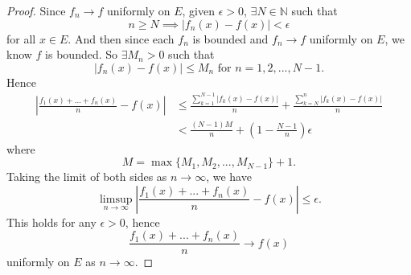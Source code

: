\begin{Exercise}
\begin{proof}
Since $f_n\to f$ uniformly on $E$, given $\epsilon > 0$, $\exists N\in\mathbb{N}$ such that $$n\geq N \implies \left| f_n(x)-f(x) \right| < \epsilon$$ for all $x\in E$. And then since each $f_n$ is bounded and $f_n\to f$ uniformly on $E$, we know $f$ is bounded. So $\exists M_n > 0$ such that $$\left| f_n(x)-f(x) \right| \leq M_n\mbox{ for } n=1,2,...,N-1.$$
Hence 
\begin{align*}
\left| \frac{f_1(x)+...+f_n(x)}{n}-f(x) \right| 
&\leq \frac{\sum_{k=1}^{N-1}\left| f_k(x)-f(x) \right|}{n} + \frac{\sum_{k=N}^{n}\left| f_k(x)-f(x) \right|}{n} \\
&< \frac{(N-1)M}{n} + \left( 1-\frac{N-1}{n} \right) \epsilon
\end{align*}
where $$ M = \max\{M_1,M_2,...,M_{N-1}\}+1.$$
Taking the limit of both sides as $n\to\infty$, we have
$$ \limsup_{n\to\infty}\left| \frac{f_1(x)+...+f_n(x)}{n}-f(x) \right| \leq \epsilon.$$
This holds for any $\epsilon > 0$, hence
$$\frac{f_1(x)+...+f_n(x)}{n}\to f(x)$$ uniformly on $E$ as $n\to\infty$.
\end{proof}
\end{Exercise}